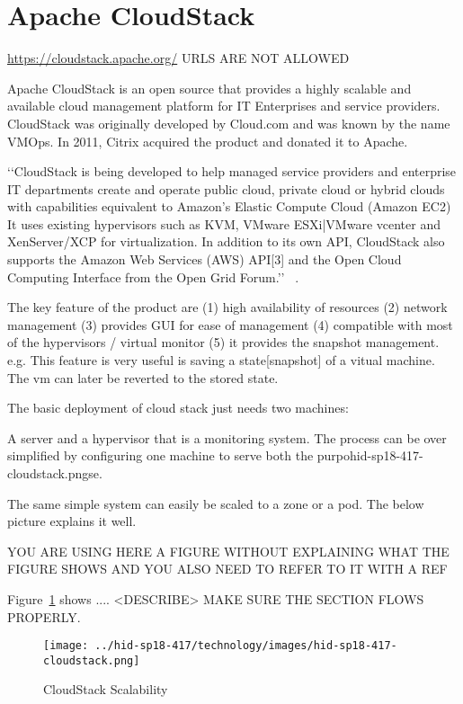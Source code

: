 
\section{Apache CloudStack}

\url{ https://cloudstack.apache.org/} URLS ARE NOT ALLOWED


Apache CloudStack is an open source that provides a highly scalable and available 
cloud management platform for IT
Enterprises and service providers. CloudStack was originally developed by 
Cloud.com and was known by the name VMOps. 
In 2011, Citrix acquired the product and donated it to Apache. 

‘‘CloudStack is being developed to help managed service providers and enterprise IT 
departments create and operate public cloud, private cloud or hybrid clouds
with capabilities equivalent to Amazon's Elastic Compute Cloud (Amazon EC2)
It uses existing hypervisors such as KVM, VMware ESXi|VMware vcenter and
XenServer/XCP for virtualization. In addition to its own API, CloudStack 
also supports the Amazon Web Services (AWS) API[3] and the Open Cloud 
Computing Interface from the Open Grid Forum.’’  
~\cite{ hid-sp18-417-wiki-cloudStack}. 

The key feature of the product are 
(1) high availability of resources
(2) network management
(3) provides GUI for ease of management
(4) compatible with most of the hypervisors / virtual monitor
(5) it provides the snapshot management. e.g. This feature is 
very useful is saving a state[snapshot] of a vitual machine. 
The vm can later be reverted to the stored state.  

 The basic deployment of cloud stack just needs two machines: 
 
 A server and a hypervisor that is a monitoring system. 
 The process can be over simplified by configuring one machine 
 to serve both the purpohid-sp18-417-cloudstack.pngse. 
 
 The same simple system can easily be scaled to a zone or a pod.
 The below picture explains it well.

YOU ARE USING HERE A FIGURE WITHOUT EXPLAINING WHAT THE FIGURE 
SHOWS AND YOU ALSO NEED TO REFER TO IT WITH A REF

Figure~\ref{F:cloudstack-scalabuility} shows .... 
<DESCRIBE> MAKE SURE THE SECTION FLOWS PROPERLY.

\begin{figure}[htb]
  \texttt{[image: ../hid-sp18-417/technology/images/hid-sp18-417-cloudstack.png]}
  \caption{CloudStack Scalability ~\cite{hid-sp18-417-cloudstack-scaling}}
  \label{F:cloudstack-scalabuility}
\end{figure}

